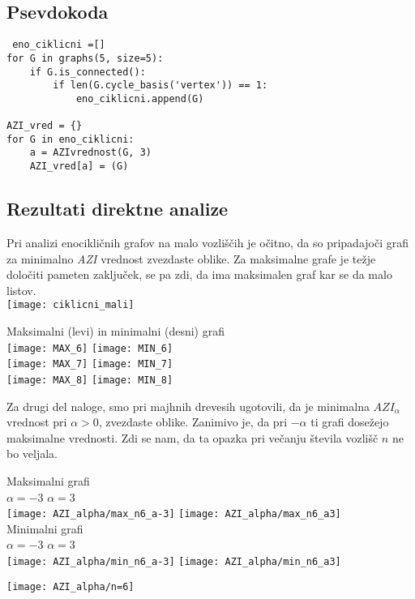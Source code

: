 \documentclass[11pt]{article} %
\begin{document}
\pagebreak

\subsection{Psevdokoda}
 
\begin{lstlisting}
 eno_ciklicni =[]
for G in graphs(5, size=5):
    if G.is_connected():
        if len(G.cycle_basis('vertex')) == 1:
            eno_ciklicni.append(G)

AZI_vred = {}
for G in eno_ciklicni:
    a = AZIvrednost(G, 3)
    AZI_vred[a] = (G)
\end{lstlisting} 

\subsection{Rezultati direktne analize}

Pri analizi enocikličnih grafov na malo vozliščih je očitno, da so pripadajoči grafi za minimalno \textit{AZI} vrednost zvezdaste oblike. Za maksimalne grafe je težje določiti pameten zaključek, se pa zdi, da ima maksimalen graf kar se da malo listov.\\

\texttt{[image: ciklicni\_mali]}


\begin{center}
Maksimalni (levi) in minimalni (desni) grafi \\
\texttt{[image: MAX\_6]}
\texttt{[image: MIN\_6]} \\
\texttt{[image: MAX\_7]}
\texttt{[image: MIN\_7]} \\
\texttt{[image: MAX\_8]}
\texttt{[image: MIN\_8]} 
\end{center}

Za drugi del naloge, smo pri majhnih drevesih ugotovili, da je minimalna $\textit{AZI}_{\alpha}$ vrednost pri $\alpha > 0$, zvezdaste oblike. Zanimivo je, da pri $-\alpha$ ti grafi dosežejo maksimalne vrednosti.  Zdi se nam, da ta opazka pri večanju števila vozlišč $n$ ne bo veljala. 

\begin{center}
Maksimalni grafi \\
$\alpha = -3$ \quad  \quad \quad \quad \quad \quad \quad \quad \quad \quad \quad $\alpha = 3$ \quad\\
\texttt{[image: AZI\_alpha/max\_n6\_a-3]}
\texttt{[image: AZI\_alpha/max\_n6\_a3]}\\
\pagebreak
Minimalni grafi \\
$\alpha = -3$ \quad  \quad \quad \quad \quad \quad \quad \quad \quad \quad \quad $\alpha = 3$ \quad\\
\texttt{[image: AZI\_alpha/min\_n6\_a-3]}
\texttt{[image: AZI\_alpha/min\_n6\_a3]}


\texttt{[image: AZI\_alpha/n=6]}
\end{center}
\end{document}
